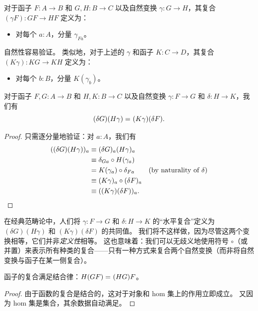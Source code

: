 \begin{defn}\label{ct:whisker}
  对于函子 $F:A\to B$ 和 $G,H:B\to C$ 以及自然变换 $\gamma:G\to H$，其复合 $(\gamma F):GF\to HF$ 定义为：
  \begin{itemize}
  \item 对每个 $a:A$，分量 $\gamma_{Fa}$。
  \end{itemize}
  自然性容易验证。
  类似地，对于上述的 $\gamma$ 和函子 $K:C\to D$，其复合 $(K\gamma):KG\to KH$ 定义为：
  \begin{itemize}
  \item 对每个 $b:B$，分量 $K(\gamma_b)$。
  \end{itemize}
\end{defn}

\begin{lem}\label{ct:interchange}
  对于函子 $F,G:A\to B$ 和 $H,K:B\to C$ 以及自然变换 $\gamma:F\to G$ 和 $\delta:H\to K$，我们有
  \[(\delta G)(H\gamma) =_{} (K\gamma)(\delta F).\]
\end{lem}

\begin{proof}
  只需逐分量地验证：对 $a:A$，我们有
  \begin{align*}
    ((\delta G)(H\gamma))_a
    &\equiv (\delta G)_{a}(H\gamma)_a\\
    &\equiv \delta_{Ga}\circ H(\gamma_a)\\
    &= K(\gamma_a) \circ \delta_{Fa} \tag{by naturality of $\delta$}\\
    &\equiv (K \gamma)_a\circ (\delta F)_a\\
    &\equiv ((K \gamma)(\delta F))_a.\qedhere
  \end{align*}
\end{proof}

%
%
在经典范畴论中，人们将 $\gamma:F\to G$ 和 $\delta:H\to K$ 的``水平复合''定义为 ${(\delta G)(H\gamma)}$ 和 ${(K\gamma)(\delta F)}$ 的共同值。
我们将不这样做，因为尽管这两个变换相等，它们并非\emph{定义性}相等。
这也意味着：我们可以无歧义地使用符号 $\circ$（或并置）来表示所有种类的复合——只有一种方式来复合两个自然变换（而非将自然变换与函子在某一侧复合）。

\begin{lem}\label{ct:functor-assoc}
  函子的复合满足结合律：$H(GF) =_{} (HG)F$。
\end{lem}

\begin{proof}
  由于函数的复合是结合的，这对于对象和 hom 集上的作用立即成立。
  又因为 hom 集是集合，其余数据自动满足。
\end{proof}

